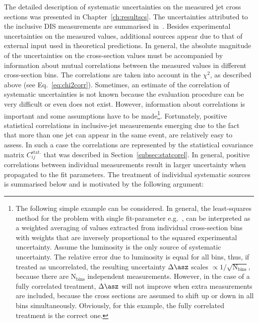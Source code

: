 The detailed description of systematic uncertainties on the measured jet cross sections was presented in Chapter~\ref{ch:resultscs}. The uncertainties attributed to the inclusive DIS measurements are summarised in~\cite{Aaron:2009aa}. Besides experimental uncertainties on the measured values, additional sources appear due to that of external input used in theoretical predictions. In general, the absolute magnitude of the uncertainties on the cross-section values must be accompanied by information about mutual correlations between the measured values in different cross-section bins. The correlations are taken into account in the $\chi^2$, as described above (see Eq.~\ref{eq:chi2corr}). Sometimes, an estimate of the correlation of systematic uncertainties is not known because the evaluation procedure can be very difficult or even does not exist. %
However, information about correlations is important and some assumptions have to be made\footnote{The following simple example can be considered. In general, the least-squares method for the problem with single fit-parameter e.g.~\asz, can be interpreted as a weighted averaging of \asz values extracted from individual cross-section bins with weights that are inversely proportional to the squared experimental uncertainty. Assume the luminosity is the only source of systematic uncertainty. The relative error due to luminosity is equal for all bins, thus, if treated as uncorrelated, the resulting uncertainty $\Delta\asz$ scales $\propto 1/\sqrt{\text{N}_\text{bins}}$, because there are $\text{N}_\text{bins}$ independent \asz measurements. However, in the case of a fully correlated treatment, $\Delta\asz$ will not improve when extra measurements are included, because the cross sections are assumed to shift up or down in all bins simultaneously. Obviously, for this example, the fully correlated treatment is the correct one.}. Fortunately, positive statistical correlations in inclusive-jet measurements emerging due to the fact that more than one jet can appear in the same event, are relatively easy to assess. In such a case the correlations are represented by the statistical covariance matrix $C_{ij}^{\text{stat.}}$ that was described in Section~\ref{subsec:statcorel}. In general, positive correlations between individual measurements result in larger uncertainty when propagated to the fit parameters. The treatment of individual systematic sources is summarised below and is motivated by the following argument: 
